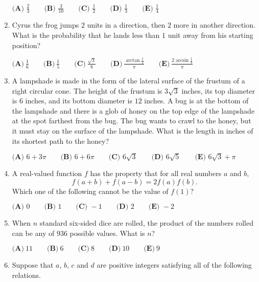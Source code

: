 \documentclass{article}
\begin{document}
\begin{enumerate}[label=\arabic*., itemsep=0.5em]
\(\textbf{(A) } \frac{2}{3} \qquad \textbf{(B) } \frac{3}{10} \qquad \textbf{(C) } \frac{1}{2} \qquad \textbf{(D) } \frac{1}{3} \qquad \textbf{(E) } \frac{1}{4}\)\par \vspace{0.5em}\item Cyrus the frog jumps \(2\) units in a direction, then \(2\) more in another direction. What is the probability that he lands less than \(1\) unit away from his starting position?

\(\textbf{(A)}~\frac{1}{6}\qquad\textbf{(B)}~\frac{1}{5}\qquad\textbf{(C)}~\frac{\sqrt{3}}{8}\qquad\textbf{(D)}~\frac{\arctan \frac{1}{2}}{\pi}\qquad\textbf{(E)}~\frac{2\arcsin \frac{1}{4}}{\pi}\)\par \vspace{0.5em}\item A lampshade is made in the form of the lateral surface of the frustum of a right circular cone. The height of the frustum is \(3\sqrt3\) inches, its top diameter is \(6\) inches, and its bottom diameter is \(12\) inches. A bug is at the bottom of the lampshade and there is a glob of honey on the top edge of the lampshade at the spot farthest from the bug. The bug wants to crawl to the honey, but it must stay on the surface of the lampshade. What is the length in inches of its shortest path to the honey?

\(\textbf{(A) } 6 + 3\pi\qquad \textbf{(B) }6 + 6\pi\qquad \textbf{(C) } 6\sqrt3 \qquad \textbf{(D) } 6\sqrt5 \qquad \textbf{(E) } 6\sqrt3 + \pi\)\par \vspace{0.5em}\item A real-valued function \(f\) has the property that for all real numbers \(a\) and \(b,\)
\begin{equation*}
f(a + b)  + f(a - b) = 2f(a) f(b).
\end{equation*}
Which one of the following cannot be the value of \(f(1)?\)

\(\textbf{(A) } 0 \qquad \textbf{(B) } 1 \qquad \textbf{(C) } -1 \qquad \textbf{(D) } 2 \qquad \textbf{(E) } -2\)\par \vspace{0.5em}\item When \(n\) standard six-sided dice are rolled, the product of the numbers rolled can be any of \(936\) possible values. What is \(n\)?

\(\textbf{(A)}~11\qquad\textbf{(B)}~6\qquad\textbf{(C)}~8\qquad\textbf{(D)}~10\qquad\textbf{(E)}~9\)\par \vspace{0.5em}\item Suppose that \(a\), \(b\), \(c\) and \(d\) are positive integers satisfying all of the following relations.



\end{enumerate}
\end{document}
